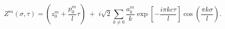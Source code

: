 \begin{equation}
    Z^m(\sigma, \tau) = \left(z^m_0 + \frac{p^m_0}{l} \tau \right)
                        \; + \;
                        i\sqrt{2} \sum_{k \neq  0} \frac{a^m_k}{k}
                        \exp\left[-\frac{i \pi k c \tau}{ l}\right]
                        \cos\left( \frac{\pi k \sigma}{l} \right) .
\end{equation}

